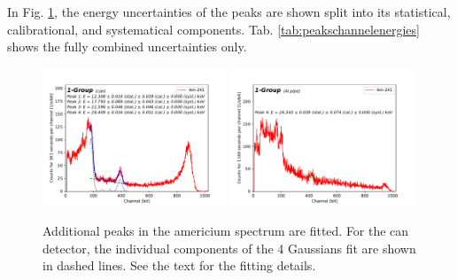 In Fig. \ref{fig:peaksearch}, the energy uncertainties of the peaks are shown split into its statistical, calibrational, and systematical components. Tab. \ref{tab:peakschannelenergies} shows the fully combined uncertainties only.

\begin{figure}[htb!]
  \includegraphics[width=0.49\textwidth,page=1]{graphics/peaksearch.pdf}
  \includegraphics[width=0.49\textwidth,page=1]{graphics/alupeaksearch.pdf}
  \caption{Additional peaks in the americium spectrum are fitted. For the can detector, the individual components of the 4 Gaussians fit are shown in dashed lines. See the text for the fitting details.}
  \label{fig:peaksearch}
\end{figure}


